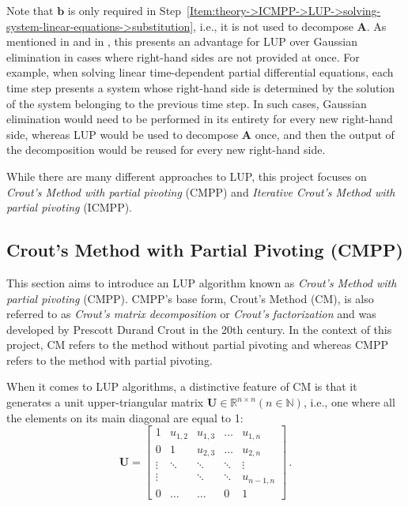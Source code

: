 Note that $\mathbf{b}$ is only required in Step~\ref{Item:theory->ICMPP->LUP->solving-system-linear-equations->substitution}, i.e., it is not used to decompose $\mathbf{A}$.
As mentioned in  \cite{Cejka2022} and in  \cite{Lindfield2019}, this presents an advantage for LUP over Gaussian elimination in cases where right-hand sides are not provided at once.
For example, when solving linear time-dependent partial differential equations, each time step presents a system whose right-hand side is determined by the solution of the system belonging to the previous time step.
In such cases, Gaussian elimination would need to be performed in its entirety for every new right-hand side, whereas LUP would be used to decompose $\mathbf{A}$ once, and then the output of the decomposition would be reused for every new right-hand side.

While there are many different approaches to LUP, this project focuses on \textit{Crout's Method with partial pivoting} (CMPP) and \textit{Iterative Crout's Method with partial pivoting} (ICMPP).



\subsection{Crout's Method with Partial Pivoting (CMPP)}\label{Subsection:theory->ICMPP->LUP->CMPP}
This section aims to introduce an LUP algorithm known as \textit{Crout's Method with partial pivoting} (CMPP).
CMPP's base form, Crout's Method (CM), is also referred to as \textit{Crout's matrix decomposition} or \textit{Crout's factorization} and was developed by Prescott Durand Crout \cite{Press2007} in the 20th century.
In the context of this project, CM refers to the method without partial pivoting and whereas CMPP refers to the method with partial pivoting.

When it comes to LUP algorithms, a distinctive feature of CM is that it generates a unit upper-triangular matrix $\mathbf{U} \in \mathbb{R}^{n \times n} \left(n \in \mathbb{N}\right)$, i.e., one where all the elements on its main diagonal are equal to 1:
\begin{equation}
	\mathbf{U} = {
		\begin{bmatrix}
			1		 & u _{1,2} & u _{1,3} & \ldots & u _{1,n}   \\
			0 		 & 1		& u _{2,3} & \ldots & u _{2,n}   \\
			\vdots   & \ddots 	& \ddots   & \ddots & \vdots 	 \\
			\vdots   & 			& \ddots   & \ddots & u _{n-1,n} \\
			0 		 & \ldots	& \ldots   & 0 		& 1
		\end{bmatrix}
	} \,.
\end{equation}

